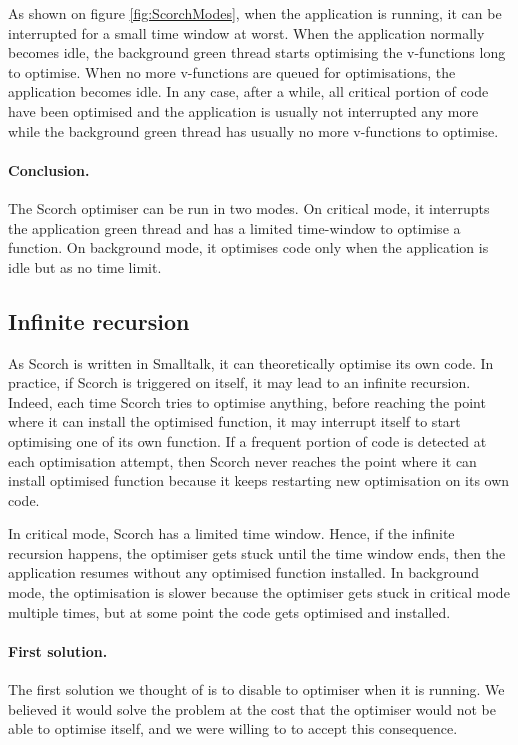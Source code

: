\documentclass[a4paper,12pt,twoside]{../includes/ThesisStyle}
\begin{document}
As shown on figure \ref{fig:ScorchModes}, when the application is running, it can be interrupted for a small time window at worst. When the application normally becomes idle, the background green thread starts optimising the v-functions long to optimise. When no more v-functions are queued for optimisations, the application becomes idle. In any case, after a while, all critical portion of code have been optimised and the application is usually not interrupted any more while the background green thread has usually no more v-functions to optimise.

\paragraph{Conclusion.} The Scorch optimiser can be run in two modes. On critical mode, it interrupts the application green thread and has a limited time-window to optimise a function. On background mode, it optimises code only when the application is idle but as no time limit. 

\subsection{Infinite recursion}

As Scorch is written in Smalltalk, it can theoretically optimise its own code. In practice, if Scorch is triggered on itself, it may lead to an infinite recursion. Indeed, each time Scorch tries to optimise anything, before reaching the point where it can install the optimised function, it may interrupt itself to start optimising one of its own function. If a frequent portion of code is detected at each optimisation attempt, then Scorch never reaches the point where it can install optimised function because it keeps restarting new optimisation on its own code.

In critical mode, Scorch has a limited time window. Hence, if the infinite recursion happens, the optimiser gets stuck until the time window ends, then the application resumes without any optimised function installed. In background mode, the optimisation is slower because the optimiser gets stuck in critical mode multiple times, but at some point the code gets optimised and installed.

\paragraph{First solution.} The first solution we thought of is to disable to optimiser when it is running. We believed it would solve the problem at the cost that the optimiser would not be able to optimise itself, and we were willing to to accept this consequence.
\end{document}
